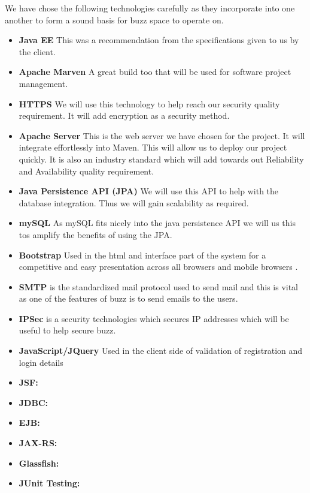 We have chose the following technologies carefully as they incorporate into one another to form a sound basis for buzz space to operate on.

\begin{itemize}
	\item \textbf{Java EE}
		This was a recommendation from the specifications given to us by the client.
	\item \textbf{Apache Marven}
		A great build too that will be used for software project management.
	\item \textbf{HTTPS}
		We will use this technology to help reach our security quality requirement. It will add encryption as a security method.
	\item \textbf{Apache Server}
		This is the web server we have chosen for the project. It will integrate effortlessly into Maven. This will allow us to deploy our project quickly. It is also an industry standard which will add towards out Reliability and Availability quality requirement. 
	\item \textbf{Java Persistence API (JPA) }
		We will use this API to help with the database integration. Thus we will gain scalability as required.
	\item \textbf{mySQL}
		As mySQL fits nicely into the java persistence API we will us this tos amplify the benefits of using the JPA.
		
		\item \textbf{Bootstrap}
		Used in the html and interface part of the system for a competitive and easy presentation across all browsers 	and mobile browsers .
		\item \textbf{SMTP} is the standardized mail protocol used to send mail and this is vital as one of the features of buzz is to send emails to the users.
		\item \textbf{IPSec} is a security technologies which secures IP addresses which will be useful to help secure buzz.
	\item \textbf{JavaScript/JQuery}
		Used in the client side of validation of registration and login details
		
			\item \textbf{JSF:}
			\item \textbf{JDBC:}
			\item \textbf{EJB:}
			\item \textbf{JAX-RS:}
			\item \textbf{Glassfish:}
			\item \textbf{JUnit Testing:}
		
\end{itemize}